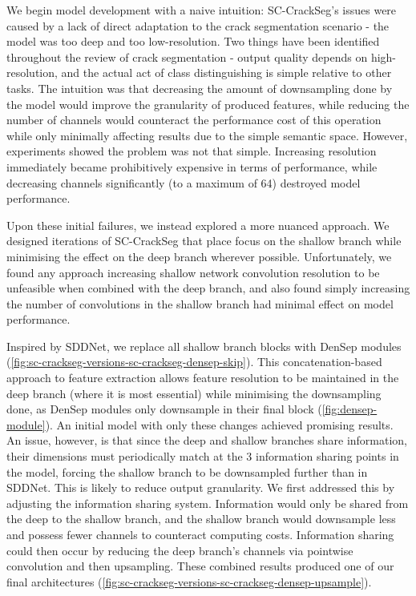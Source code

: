 \documentclass[a4paper,12pt]{report}
\begin{document}
We begin model development with a naive intuition: SC-CrackSeg's issues were caused by a lack of direct adaptation to the crack segmentation scenario - the model was too deep and too low-resolution. Two things have been identified throughout the review of crack segmentation - output quality depends on high-resolution, and the actual act of class distinguishing is simple relative to other tasks. The intuition was that decreasing the amount of downsampling done by the model would improve the granularity of produced features, while reducing the number of channels would counteract the performance cost of this operation while only minimally affecting results due to the simple semantic space. However, experiments showed the problem was not that simple. Increasing resolution immediately became prohibitively expensive in terms of performance, while decreasing channels significantly (to a maximum of 64) destroyed model performance.

Upon these initial failures, we instead explored a more nuanced approach. We designed iterations of SC-CrackSeg that place focus on the shallow branch while minimising the effect on the deep branch wherever possible. Unfortunately, we found any approach increasing shallow network convolution resolution to be unfeasible when combined with the deep branch, and also found simply increasing the number of convolutions in the shallow branch had minimal effect on model performance.

Inspired by SDDNet, we replace all shallow branch blocks with DenSep modules (\autoref{fig:sc-crackseg-versions-sc-crackseg-densep-skip}). This concatenation-based approach to feature extraction allows feature resolution to be maintained in the deep branch (where it is most essential) while minimising the downsampling done, as DenSep modules only downsample in their final block (\autoref{fig:densep-module}). An initial model with only these changes achieved promising results. An issue, however, is that since the deep and shallow branches share information, their dimensions must periodically match at the 3 information sharing points in the model, forcing the shallow branch to be downsampled further than in SDDNet. This is likely to reduce output granularity. We first addressed this by adjusting the information sharing system. Information would only be shared from the deep to the shallow branch, and the shallow branch would downsample less and possess fewer channels to counteract computing costs. Information sharing could then occur by reducing the deep branch's channels via pointwise convolution and then upsampling. These combined results produced one of our final architectures (\autoref{fig:sc-crackseg-versions-sc-crackseg-densep-upsample}).
\end{document}
